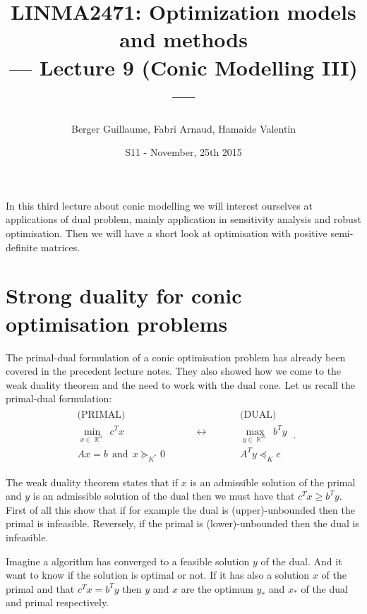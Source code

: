 \documentclass[12pt,a4paper]{article}
\title{LINMA2471: Optimization models and methods \\\smallskip --- Lecture 9 (Conic Modelling III) ---}
\author{Berger Guillaume, Fabri Arnaud, Hamaide Valentin}
\date{S11 - November, 25th 2015}
\theoremstyle{definition}
\theoremstyle{plain}
\DeclareMathOperator{\reals}{\mathbb{R}}
\begin{document}
\maketitle


In this third lecture about conic modelling we will interest ourselves at applications of dual problem, mainly application in sensitivity analysis and robust optimisation. Then we will have a short look at optimisation with positive semi-definite matrices.

\section{Strong duality for conic optimisation problems}

The primal-dual formulation of a conic optimisation problem has already been covered in the precedent lecture notes. They also showed how we come to the weak duality theorem and the need to work with the dual cone. Let us recall the primal-dual formulation:
\begin{align*}
\: \begin{array}{ccc}
    \text{(PRIMAL)} & & \text{(DUAL)} \\
    \min_{x\in\reals^n}\; c^Tx & \hspace{1cm}\longleftrightarrow\hspace{1cm}~ & \max_{y\in\reals^m}\; b^Ty \\
    Ax = b \:\:\text{and}\:\: x \succeq_{K^*} 0 & & A^Ty \preceq_K c
\end{array} \:.
\end{align*}

The weak duality theorem states that if $x$ is an admissible solution of the primal and $y$ is an admissible solution of the dual then we must have that $c^Tx\geq b^Ty$. First of all this show that if for example the dual is (upper)-unbounded then the primal is infeasible. Reversely, if the primal is (lower)-unbounded then the dual is infeasible.

Imagine a algorithm has converged to a feasible solution $y$ of the dual. And it want to know if the solution is optimal or not. If it has also a solution $x$ of the primal and that $c^Tx=b^Ty$ then $y$ and $x$ are the optimum $y_*$ and $x_*$ of the dual and primal respectively.
\end{document}
